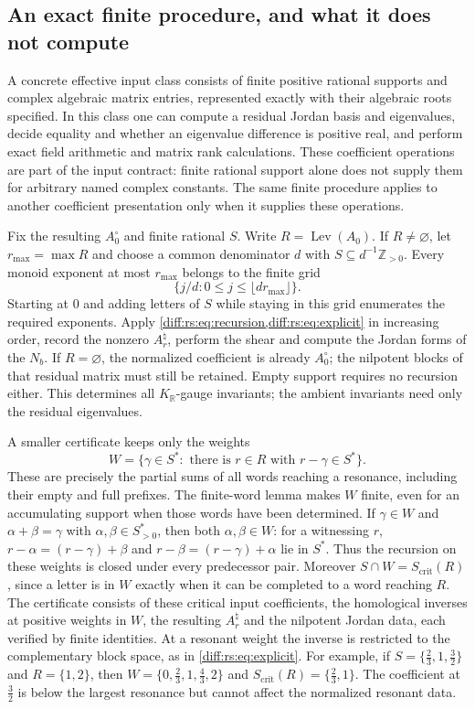 \documentclass[11pt,letterpaper]{article}
\numberwithin{equation}{section}
\theoremstyle{definition}
\theoremstyle{remark}
\newcommand{\R}{\mathbb R}
\newcommand{\Z}{\mathbb Z}
\newcommand{\KR}{K_{\R}}
\newcommand{\Lev}{\operatorname{Lev}}
\newcommand{\crit}{\mathrm{crit}}
\begin{document}
\subsection{An exact finite procedure, and what it does not compute}
\label{diff:rs:sub:procedure}

A concrete effective input class consists of finite positive rational
supports and complex algebraic matrix entries, represented exactly with
their algebraic roots specified. In this class one can compute a residual
Jordan basis and eigenvalues, decide equality and whether an eigenvalue
difference is positive real, and perform exact field arithmetic and
matrix rank calculations. These coefficient operations are part of the
input contract: finite rational support alone does not supply them for
arbitrary named complex constants. The same finite procedure applies to
another coefficient presentation only when it supplies these operations.

Fix the resulting $A_0^\circ$ and finite rational $S$. Write
$R=\Lev(A_0)$. If $R\neq\varnothing$, let $r_{\max}=\max R$ and
choose a common denominator $d$ with $S\subseteq d^{-1}\Z_{>0}$.
Every monoid exponent at most $r_{\max}$ belongs to the finite grid
\[
 \{j/d:0\leq j\leq\lfloor dr_{\max}\rfloor\}.
\]
Starting at $0$ and adding letters of $S$ while staying in this grid
enumerates the required exponents. Apply
\cref{diff:rs:eq:recursion,diff:rs:eq:explicit} in increasing order,
record the nonzero $A^\natural_r$, perform the shear and compute the
Jordan forms of the $N_b$. If $R=\varnothing$, the normalized
coefficient is already $A_0^\circ$; the nilpotent blocks of that
residual matrix must still be retained. Empty support requires no
recursion either. This determines all $\KR$-gauge invariants; the
ambient invariants need only the residual eigenvalues.

A smaller certificate keeps only the weights
\[
 W=\{\gamma\in S^*:\text{ there is }r\in R
                         \text{ with }r-\gamma\in S^*\}.
\]
These are precisely the partial sums of all words reaching a resonance,
including their empty and full prefixes. The finite-word lemma makes
$W$ finite, even for an accumulating support when those words have
been determined. If $\gamma\in W$ and
$\alpha+\beta=\gamma$ with $\alpha,\beta\in S^*_{>0}$, then both
$\alpha,\beta\in W$: for a witnessing $r$,
$r-\alpha=(r-\gamma)+\beta$ and
$r-\beta=(r-\gamma)+\alpha$ lie in $S^*$.
Thus the recursion on these weights is closed under every predecessor
pair. Moreover $S\cap W=S_{\crit}(R)$, since a letter is in $W$
exactly when it can be completed to a word reaching $R$.
The certificate consists of these critical input coefficients, the
homological inverses at positive weights in $W$, the resulting
$A^\natural_r$ and the nilpotent Jordan data, each verified by finite
identities. At a resonant weight the inverse is restricted to the
complementary block space, as in \cref{diff:rs:eq:explicit}.
For example, if $S=\{\tfrac23,1,\tfrac32\}$ and $R=\{1,2\}$, then
$W=\{0,\tfrac23,1,\tfrac43,2\}$ and
$S_{\crit}(R)=\{\tfrac23,1\}$. The coefficient at $\tfrac32$ is below
the largest resonance but cannot affect the normalized resonant data.
\end{document}

